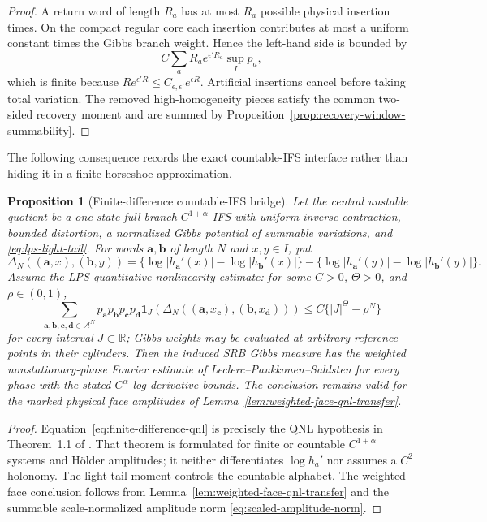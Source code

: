 \documentclass[11pt]{article}
\newtheorem{proposition}[theorem]{Proposition}
\newcommand{\one}{\mathbf 1}
\begin{document}
\begin{proof}
A return word of length $R_a$ has at most $R_a$ possible physical insertion
times.  On the compact regular core each insertion contributes at most a
uniform constant times the Gibbs branch weight.  Hence the left-hand side is
bounded by
\[
 C\sum_a R_a e^{\epsilon'R_a}\sup_I p_a,
\]
which is finite because
$R e^{\epsilon'R}\le C_{\epsilon,\epsilon'}e^{\epsilon R}$.
Artificial insertions cancel before taking total variation.  The removed
high-homogeneity pieces satisfy the common two-sided recovery moment and are
summed by Proposition~\ref{prop:recovery-window-summability}.
\end{proof}

The following consequence records the exact countable-IFS interface rather
than hiding it in a finite-horseshoe approximation.

\begin{proposition}[Finite-difference countable-IFS bridge]
\label{prop:countable-ifs-bridge}
Let the central unstable quotient be a one-state full-branch
$C^{1+\alpha}$ IFS with uniform inverse contraction, bounded distortion, a
normalized Gibbs potential of summable variations, and
\eqref{eq:lps-light-tail}.  For words $\mathbf a,\mathbf b$ of length $N$
and $x,y\in I$, put
\[
 \Delta_N((\mathbf a,x),(\mathbf b,y))
 =\{\log|h_{\mathbf a}'(x)|-\log|h_{\mathbf b}'(x)|\}
  -\{\log|h_{\mathbf a}'(y)|-\log|h_{\mathbf b}'(y)|\}.
\]
Assume the LPS quantitative nonlinearity estimate: for some
$C>0$, $\Theta>0$, and $\rho\in(0,1)$,
\begin{equation}
\label{eq:finite-difference-qnl}
 \sum_{\mathbf a,\mathbf b,\mathbf c,\mathbf d\in\mathcal A^N}
 p_{\mathbf a}p_{\mathbf b}p_{\mathbf c}p_{\mathbf d}
 \one_{J}\!\left(
 \Delta_N((\mathbf a,x_{\mathbf c}),
          (\mathbf b,x_{\mathbf d}))\right)
 \le C\{|J|^\Theta+\rho^N\}
\end{equation}
for every interval $J\subset\mathbb R$; Gibbs weights may be evaluated at
arbitrary reference points in their cylinders.  Then the induced SRB Gibbs
measure has the weighted nonstationary-phase Fourier estimate of
Leclerc--Paukkonen--Sahlsten for every phase with the stated
$C^\alpha$ log-derivative bounds.  The conclusion remains valid for the
marked physical face amplitudes of
Lemma~\ref{lem:weighted-face-qnl-transfer}.
\end{proposition}

\begin{proof}
Equation~\eqref{eq:finite-difference-qnl} is precisely the QNL hypothesis in
Theorem~1.1 of \cite{LPS}.  That theorem is formulated for finite or
countable $C^{1+\alpha}$ systems and H\"older amplitudes; it neither
differentiates $\log h_a'$ nor assumes a $C^2$ holonomy.  The light-tail
moment controls the countable alphabet.  The weighted-face conclusion follows
from Lemma~\ref{lem:weighted-face-qnl-transfer} and the summable
scale-normalized amplitude norm \eqref{eq:scaled-amplitude-norm}.
\end{proof}
\end{document}
